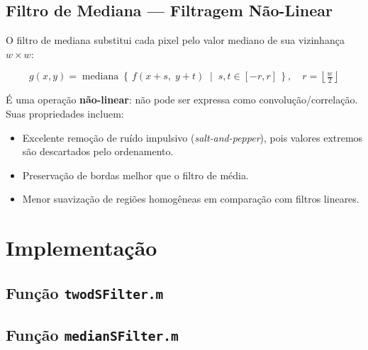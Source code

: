 \documentclass[12pt,a4paper]{article}
\begin{document}
\subsection{Filtro de Mediana — Filtragem Não-Linear}

O filtro de mediana substitui cada pixel pelo valor mediano de sua
vizinhança $w\times w$:

\begin{equation}
  g(x,y) = \operatorname{mediana}\!\left\{\,f(x+s,\; y+t)
            \;\middle|\; s,t \in [-r, r]\,\right\},
  \quad r = \left\lfloor\tfrac{w}{2}\right\rfloor
  \label{eq:median}
\end{equation}

É uma operação \textbf{não-linear}: não pode ser expressa como
convolução/correlação. Suas propriedades incluem:

\begin{itemize}
  \item Excelente remoção de ruído impulsivo (\emph{salt-and-pepper}),
        pois valores extremos são descartados pelo ordenamento.
  \item Preservação de bordas melhor que o filtro de média.
  \item Menor suavização de regiões homogêneas em comparação com
        filtros lineares.
\end{itemize}

\section{Implementação}

\subsection{Função \texttt{twodSFilter.m}}



\subsection{Função \texttt{medianSFilter.m}}


\end{document}
